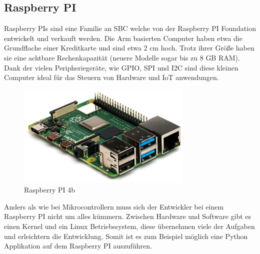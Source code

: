 ﻿\subsection{Raspberry PI}
\label{sec:raspberry_pi}

Raspberry PIs sind eine Familie an \ac{SBC} welche von der Raspberry PI Foundation entwickelt und verkauft werden. Die \ac{Arm} basierten Computer haben etwa die Grundflache einer Kreditkarte und sind etwa 2 cm hoch. Trotz ihrer Größe haben sie eine achtbare Rechenkapazität (neuere Modelle sogar bis zu 8 GB \ac{RAM}\cite{raspberry_pi_4b}). Dank der vielen Peripheriegeräte, wie \ac{GPIO}, \ac{SPI} und \ac{I2C} sind diese kleinen Computer ideal für das Steuern von Hardware und \ac{IoT} anwendungen.

\begin{figure}[H]
  \centering
  \includegraphics[width=0.75\textwidth]{images/raspberry_pi_4b}
  \caption{Raspberry PI 4b\cite{raspberry_pi_4b}}
  \label{fig:raspberry_pi_4b}
\end{figure}

Anders als wie bei Mikrocontrollern muss sich der Entwickler bei einem Raspberry PI nicht um alles kümmern. Zwischen Hardware und Software gibt es einen Kernel und ein Linux Betriebssystem, diese übernehmen viele der Aufgaben und erleichtern die Entwicklung. Somit ist es zum Beispiel möglich eine Python Applikation auf dem Raspberry PI auszuführen.

